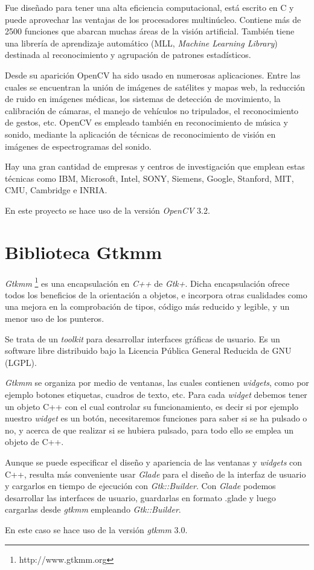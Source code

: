 Fue diseñado para tener una alta eficiencia computacional, está escrito en C y puede aprovechar las ventajas de los procesadores multinúcleo. Contiene más  de  2500  funciones  que  abarcan  muchas  áreas  de  la  visión  artificial.  También  tiene  una librería   de   aprendizaje   automático   (MLL,  \textit{Machine   Learning   Library})   destinada   al reconocimiento  y agrupación de patrones estadísticos.

Desde su aparición OpenCV ha sido usado en numerosas aplicaciones. Entre las cuales se encuentran la unión de imágenes de satélites y mapas web, la reducción de ruido en imágenes  médicas,  los  sistemas  de  detección  de movimiento,  la  calibración  de  cámaras,  el manejo  de  vehículos  no  tripulados, el  reconocimiento  de  gestos, etc. OpenCV  es  empleado también  en  reconocimiento  de  música  y  sonido,  mediante  la  aplicación  de  técnicas  de reconocimiento de visión en imágenes de espectrogramas del sonido.

Hay  una  gran  cantidad  de  empresas    y  centros  de  investigación  que  emplean  estas técnicas como IBM, Microsoft, Intel, SONY, Siemens, Google, Stanford, MIT, CMU, Cambridge e INRIA.

En este proyecto se hace uso de la versión \textit{OpenCV} 3.2.


\section{Biblioteca Gtkmm}

\textit{Gtkmm} \footnote{http://www.gtkmm.org} es una encapsulación en \textit{C++} de \textit{Gtk+}. Dicha encapsulación ofrece todos los beneficios de la orientación a objetos, e incorpora otras cualidades como una mejora en la comprobación de tipos, código más reducido y legible, y un menor uso de los punteros. 

Se trata de un \textit{toolkit} para desarrollar interfaces gráficas de usuario. Es un software libre distribuido bajo la Licencia Pública General Reducida de GNU (LGPL).

\textit{Gtkmm} se organiza por medio de ventanas, las cuales contienen \textit{widgets}, como por ejemplo botones etiquetas, cuadros de texto, etc.  Para cada \textit{widget} debemos tener un objeto C++ con el cual controlar su funcionamiento, es decir si por ejemplo nuestro \textit{widget} es un botón, necesitaremos funciones para saber si se ha pulsado o no, y acerca de que realizar si se hubiera pulsado, para todo ello se emplea un objeto de C++. 

Aunque se puede especificar el diseño y apariencia de las ventanas y \textit{widgets} con C++, resulta más conveniente usar \textit{Glade} para el diseño de la interfaz de usuario y cargarlos en tiempo de ejecución con \textit{Gtk::Builder}. Con  \textit{Glade} podemos desarrollar las interfaces de usuario, guardarlas en formato .glade y luego cargarlas desde \textit{gtkmm} empleando \textit{ Gtk::Builder}.

En este caso se hace uso de la versión \textit{gtkmm} 3.0.



